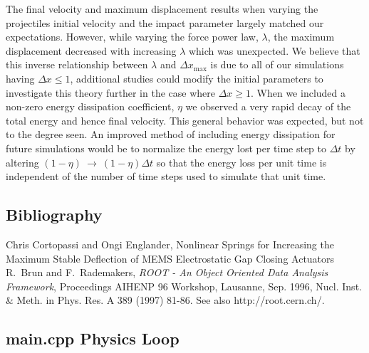 \documentclass[aps,prl,floatfix,preprint,nofootinbib]{revtex4}
\begin{document}
The final velocity and maximum displacement results when varying the projectiles initial velocity and the impact parameter largely matched our expectations. However, while varying the force power law, $\lambda$, the maximum displacement decreased with increasing $\lambda$ which was unexpected. We believe that this inverse relationship between $\lambda$ and $\Delta x_{\text{max}}$ is due to all of our simulations having $\Delta x \leq 1$, additional studies could modify the initial parameters to investigate this theory further in the case where $\Delta x \geq 1$. When we included a non-zero energy dissipation coefficient, $\eta$ we observed a very rapid decay of the total energy and hence final velocity. This general behavior was expected, but not to the degree seen. An improved method of including energy dissipation for future simulations would be to normalize the energy lost per time step to $\Delta t$ by altering $\left(1-\eta\right)~\rightarrow~\left(1-\eta\right)\Delta t$ so that the energy loss per unit time is independent of the number of time steps used to simulate that unit time. 

\clearpage
\begin{thebibliography}{9}
  \section{Bibliography}
  Chris Cortopassi and Ongi Englander, Nonlinear Springs for Increasing the Maximum Stable Deflection of MEMS Electrostatic Gap Closing Actuators
  R.~Brun and F.~Rademakers, \emph{ROOT - An Object Oriented Data Analysis Framework}, Proceedings AIHENP 96 Workshop, Lausanne, Sep. 1996, Nucl. Inst. \& Meth. in Phys. Res. A 389 (1997) 81-86. See also http://root.cern.ch/.
\end{thebibliography}

\clearpage
\begin{appendices}
  \singlespacing
  \section{main.cpp Physics Loop} \label{sec:main.cpp}

\end{appendices}
\end{document}
